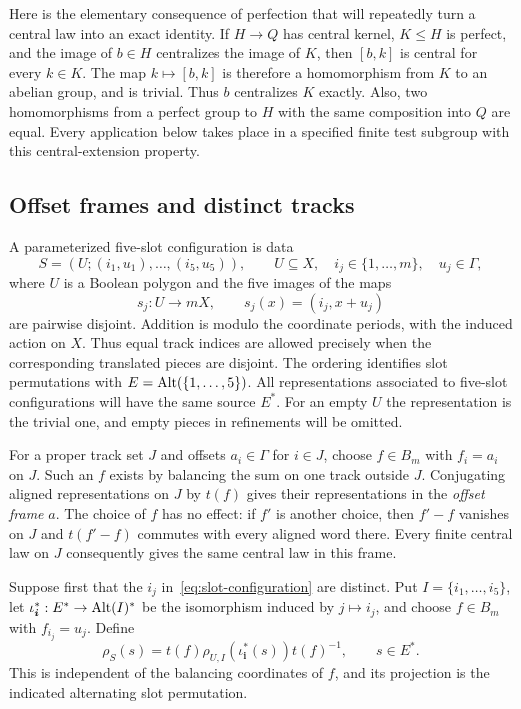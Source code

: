 Here is the elementary consequence of perfection that will repeatedly
turn a central law into an exact identity.  If $H\to Q$ has central kernel,
$K\leq H$ is perfect, and the image of $b\in H$ centralizes the image of
$K$, then $[b,k]$ is central for every $k\in K$.  The map
$k\mapsto[b,k]$ is therefore a homomorphism from $K$ to an abelian group,
and is trivial.  Thus $b$ centralizes $K$ exactly.  Also, two homomorphisms
from a perfect group to $H$ with the same composition into $Q$ are equal.
Every application below takes place in a specified finite test subgroup
with this central-extension property.

\subsection{Offset frames and distinct tracks}

A parameterized five-slot configuration is data
\begin{equation}
 S=(U;(i_1,u_1),\ldots,(i_5,u_5)),
 \qquad U\subseteq X,\quad i_j\in\{1,\ldots,m\},\quad u_j\in\Gamma,
 \label{eq:slot-configuration}
\end{equation}
where $U$ is a Boolean polygon and the five images of the maps
\[
 s_j:U\longrightarrow mX,\qquad s_j(x)=(i_j,x+u_j)
\]
are pairwise disjoint.  Addition is modulo the coordinate periods, with
the induced action on $X$.  Thus equal track indices are allowed precisely
when the corresponding translated pieces are disjoint.  The ordering
identifies slot permutations with
$E=\operatorname{Alt}(\{1,\ldots,5\})$.  All representations associated to five-slot
configurations will have the same source $E^\ast$.  For an empty $U$ the
representation is the trivial one, and empty pieces in refinements will
be omitted.

For a proper track set $J$ and offsets $a_i\in\Gamma$ for $i\in J$, choose
$f\in B_m$ with $f_i=a_i$ on $J$.  Such an $f$ exists by balancing the sum
on one track outside $J$.  Conjugating aligned representations on $J$ by
$t(f)$ gives their representations in the \emph{offset frame} $a$.  The
choice of $f$ has no effect: if $f'$ is another choice, then $f'-f$ vanishes
on $J$ and $t(f'-f)$ commutes with every aligned word there.  Every finite
central law on $J$ consequently gives the same central law in this frame.

Suppose first that the $i_j$ in~\eqref{eq:slot-configuration} are distinct.
Put $I=\{i_1,\ldots,i_5\}$, let
$\iota_{\boldsymbol i}^\ast:E^\ast\to\operatorname{Alt}(I)^\ast$ be the isomorphism
induced by $j\mapsto i_j$, and choose $f\in B_m$ with $f_{i_j}=u_j$.
Define
\begin{equation}
 \rho_S(s)=t(f)\rho_{U,I}(\iota_{\boldsymbol i}^\ast(s))t(f)^{-1},
 \qquad s\in E^\ast.
 \label{eq:distinct-slot-copy}
\end{equation}
This is independent of the balancing coordinates of $f$, and its
projection is the indicated alternating slot permutation.

